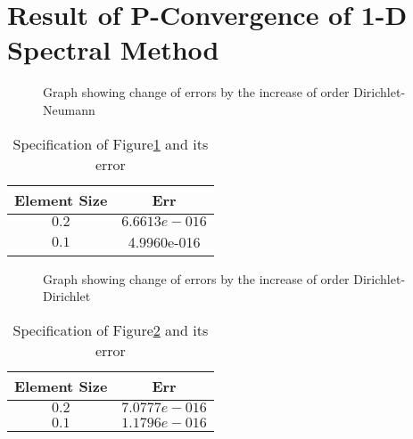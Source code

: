 \section {Result of P-Convergence of 1-D Spectral Method}

\begin{figure}[h]
\begin{center}
\caption{\label{pconv1f}Graph showing change of errors by the
increase of order Dirichlet-Neumann}
\end{center}
\end{figure}


\begin{table}[h]
\centering \caption{\label{pconv1t} Specification of
                              Figure\ref{pconv1f} and its error}
\begin{tabular}{|c|c|} \hline
Element Size&Err   \\ \hline \hline $0.2$&$6.6613e-016$ \\ \hline
$0.1$&4.9960e-016 \\ \hline
\end{tabular}
\end{table}

\begin{figure}[h]
\begin{center}
\caption{\label{pconv2f}Graph showing change of errors by the
increase of order Dirichlet-Dirichlet}
\end{center}
\end{figure}


\begin{table}[h]
\centering \caption{\label{pconv2t} Specification of
                              Figure\ref{pconv2f} and its error}
\begin{tabular}{|c|c|} \hline
Element Size&Err   \\ \hline \hline $0.2$&$7.0777e-016$ \\ \hline
$0.1$&$1.1796e-016$ \\ \hline
\end{tabular}
\end{table}
